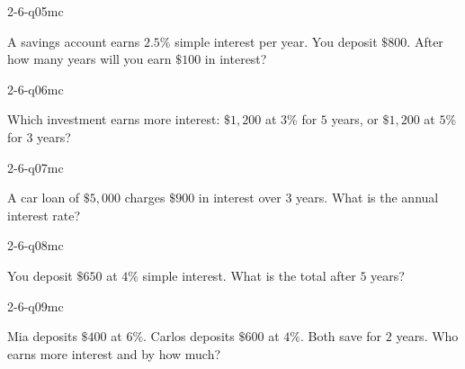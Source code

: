 \begin{practiceQuestion}{2-6-q05}{mc}
\begin{questionText}
A savings account earns $2.5\%$ simple interest per year. You deposit $\$800$. After how many years will you earn $\$100$ in interest?
\end{questionText}
\end{practiceQuestion}

\begin{practiceQuestion}{2-6-q06}{mc}
\begin{questionText}
Which investment earns more interest: $\$1{,}200$ at $3\%$ for $5$ years, or $\$1{,}200$ at $5\%$ for $3$ years?
\end{questionText}
\end{practiceQuestion}

\begin{practiceQuestion}{2-6-q07}{mc}
\begin{questionText}
A car loan of $\$5{,}000$ charges $\$900$ in interest over $3$ years. What is the annual interest rate?
\end{questionText}
\end{practiceQuestion}

\begin{practiceQuestion}{2-6-q08}{mc}
\begin{questionText}
You deposit $\$650$ at $4\%$ simple interest. What is the total after $5$ years?
\end{questionText}
\end{practiceQuestion}

\begin{practiceQuestion}{2-6-q09}{mc}
\begin{questionText}
Mia deposits $\$400$ at $6\%$. Carlos deposits $\$600$ at $4\%$. Both save for $2$ years. Who earns more interest and by how much?
\end{questionText}
\end{practiceQuestion}

